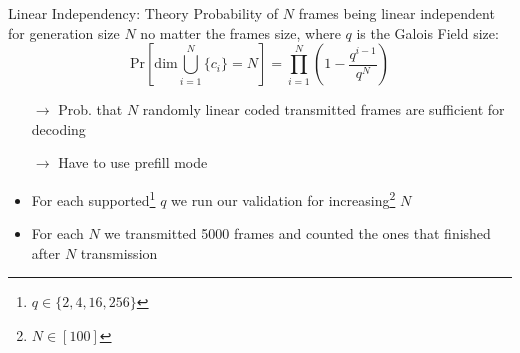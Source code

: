 \documentclass[t]{beamer} %
\begin{document}
\begin{frame}{Linear Independency: Theory}
  Probability of $N$ frames being linear independent for generation size $N$ no matter the frames size, where $q$ is the Galois Field size:%
\begin{equation} 
  \text{Pr}\left[\text{dim}\bigcup_{i=1}^{N}\{c_i\} = N\right] = \prod_{i=1}^{N} \left(1 - \frac{q^{i - 1}}{q ^ {N}}\right)
  \label{eq:decode_prob}
\end{equation}
\begin{itemize}
  \item[$\rightarrow$] Prob. that $N$ randomly linear coded transmitted frames are sufficient for decoding
  \item[$\rightarrow$] Have to use prefill mode
  \item For each supported\footnote{$q\in\{2, 4, 16, 256\}$} $q$ we run our validation for increasing\footnote{$N\in[100]$} $N$
  \item For each $N$ we transmitted 5000 frames and counted the ones that finished after $N$ transmission
\end{itemize}
\end{frame}
\end{document}
